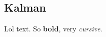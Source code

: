 \documentclass[Main]{subfiles}
\begin{document}
\subsection{Kalman} %
	\label{sec:kalman}

	Lol text.
	So \textbf{bold}, very \emph{cursive}.

\end{document}
